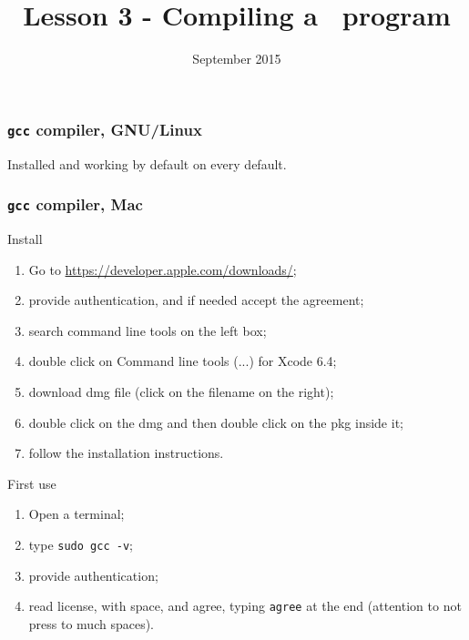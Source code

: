 


\title[Lesson 3]{\textbf{Lesson 3 - Compiling a \C\ program}}
\date[10/9/15]{ September 2015}



\begin{frame}[plain]
  \titlepage
\end{frame}

\begin{frame}
  \frametitle{\texttt{gcc} compiler, GNU/Linux}
  Installed and working by default on every default.
\end{frame}

\begin{frame}
  \frametitle{\texttt{gcc} compiler, Mac}
  \footnotesize
  \begin{block}{Install}
    \begin{enumerate}
    \item Go to \url{https://developer.apple.com/downloads/};
    \item provide authentication, and if needed accept the agreement;
    \item search \alert{command line tools} on the left box;
    \item double click on \alert{Command line tools (...) for Xcode
        6.4};
    \item download \alert{dmg} file (click on the filename on the right);
    \item double click on the \alert{dmg} and then double
      click on the \alert{pkg} inside it;
    \item follow the installation instructions.
    \end{enumerate}
  \end{block}
  \begin{block}{First use}
    \begin{enumerate}
    \item Open a terminal;
    \item type \alert{\texttt{sudo gcc -v}};
    \item provide authentication;
    \item read license, with \alert{space}, and agree, typing
      \alert{\texttt{agree}} at the end (attention to not press to
      much spaces).
    \end{enumerate}
  \end{block}
\end{frame}

